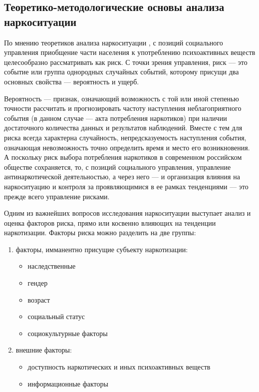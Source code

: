 \documentclass[a4paper,14pt]{article}
\begin{document}
\subsection{Теоретико-методологические основы анализа наркоситуации}

По мнению теоретиков анализа наркоситуации \cite{Karpets2010}, с позиций
социального управления приобщение части населения к употреблению психоактивных
веществ целесообразно рассматривать как риск. С точки зрения управления, риск
–-- это событие или группа однородных случайных событий, которому присущи два
основных свойства --– вероятность и ущерб.

Вероятность –-- признак, означающий возможность с той или иной степенью точности
рассчитать и прогнозировать частоту наступления неблагоприятного события (в
данном случае --– акта потребления наркотиков) при наличии достаточного
количества данных и результатов наблюдений. Вместе с тем для риска всегда
характерна случайность, непредсказуемость наступления события, означающая
невозможность точно определить время и место его возникновения. А поскольку риск
выбора потребления наркотиков в современном российском обществе сохраняется, то,
с позиций социального управления, управление антинаркотической деятельностью, а
через него –-- и организация влияния на наркоситуацию и контроля за
проявляющимися в ее рамках тенденциями –-- это прежде всего управление рисками.

Одним из важнейших вопросов исследования наркоситуации выступает анализ и
оценка факторов риска, прямо или косвенно влияющих на тенденции наркотизации. 
Факторы риска можно разделить на две группы:
\begin{enumerate}
    \item факторы, имманентно присущие субъекту наркотизации:
        \begin{itemize}
            \item наследственные
            \item гендер
            \item возраст
            \item социальный статус
            \item социокультурные факторы
        \end{itemize}
    \item внешние факторы:
        \begin{itemize}
            \item доступность наркотических и иных психоактивных веществ
            \item информационные факторы	
        \end{itemize}
\end{enumerate}	
\end{document}

